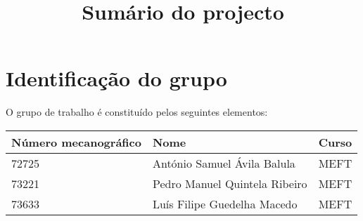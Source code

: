 \documentclass[%
	nofootinbib,
	amsmath,amssymb,
	aps,
	12pt,
	a4paper
]{article}
\begin{document}


\title{Sumário do projecto}
\date{}
\maketitle


\section{Identificação do grupo}
O grupo de trabalho é constituído pelos seguintes elementos:

\begin{center}
	\begin{tabular}{lll}
		Número mecanográfico	&Nome			&Curso	\\ \hline
		72725					&António Samuel Ávila Balula	&MEFT	\\
		73221					&Pedro Manuel Quintela Ribeiro	&MEFT	\\
		73633					&Luís Filipe Guedelha Macedo 	&MEFT	\\
	\end{tabular}
\end{center}
\end{document}
